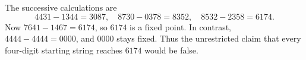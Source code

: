 The successive calculations are
\[4431-1344=3087,\quad8730-0378=8352,\quad8532-2358=6174.\]
Now $7641-1467=6174$, so $\boxed{6174}$ is a fixed point. In contrast, $4444-4444=0000$, and $0000$ stays fixed. Thus the unrestricted claim that every four-digit starting string reaches $6174$ would be false.
